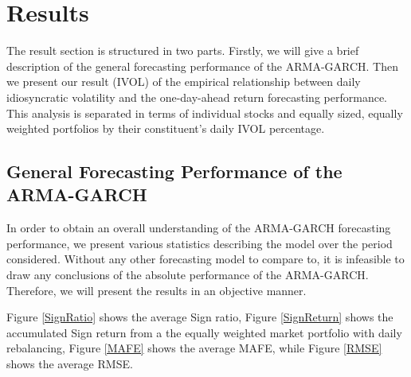 \chapter{Results}
\label{Results}
The result section is structured in two parts. Firstly, we will give a brief description of the general forecasting performance of the ARMA-GARCH. Then we present our result (IVOL) of the empirical relationship between daily idiosyncratic volatility and the one-day-ahead return forecasting performance. This analysis is separated in terms of individual stocks and equally sized, equally weighted portfolios by their constituent's daily IVOL percentage.

\section{General Forecasting Performance of the ARMA-GARCH}
In order to obtain an overall understanding of the ARMA-GARCH forecasting performance, we present various statistics describing the model over the period considered. Without any other forecasting model to compare to, it is infeasible to draw any conclusions of the absolute performance of the ARMA-GARCH. Therefore, we will present the results in an objective manner.

Figure \ref{SignRatio} shows the average Sign ratio, Figure \ref{SignReturn} shows the accumulated Sign return from a the equally weighted market portfolio with daily rebalancing, Figure \ref{MAFE} shows the average MAFE, while Figure \ref{RMSE} shows the average RMSE.

